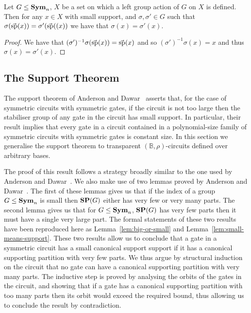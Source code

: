 \documentclass[../paper.tex]{subfiles}
\begin{document}
\begin{lem}
  Let $G \leq \text{\textbf{Sym}}_n$, $X$ be a set on which a left group action of $G$ on $X$
  is defined. Then for any $x \in X$ with small support, and $\sigma, \sigma'
  \in G$ such that $\sigma (\vec{\text{sp}}(x)) = \sigma' (\vec{\text{sp}}((x))$ we
  have that $\sigma (x) = \sigma'(x)$.
  \label{lem:support-determine-action}
\end{lem}
\begin{proof}
  We have that $(\sigma')^{-1}\sigma(\vec{\text{sp}}(x)) = \vec{\text{sp}}(x)$ and so
  $(\sigma')^{-1} \sigma (x) = x$ and thus $\sigma (x) = \sigma' (x)$.
\end{proof}


\subsection{The Support Theorem}
The support theorem of Anderson and Dawar~\cite{AndersonD17} asserts that, for
the case of symmetric circuits with symmetric gates, if the circuit is not too
large then the stabiliser group of any gate in the circuit has small support. In
particular, their result implies that every gate in a circuit contained in a
polynomial-size family of symmetric circuits with symmetric gates is constant
size. In this section we generalise the support theorem to transparent
$(\mathbb{B}, \rho)$-circuits defined over arbitrary bases.

The proof of this result follows a strategy broadly similar to the one used by
Anderson and Dawar~\cite{AndersonD17}. We also make use of two lemmas proved by
Anderson and Dawar~\cite{AndersonD17}. The first of these lemmas gives us that
if the index of a group $G \leq \text{\textbf{Sym}}_n$ is small then $\text{\textbf{SP}}(G)$ either has very
few or very many parts. The second lemma gives us that for $G \leq \text{\textbf{Sym}}_n$,
$\text{\textbf{SP}}(G)$ has very few parts then it must have a single very large part. The
formal statements of these two results have been reproduced here as
Lemma~\ref{lem:big-or-small} and Lemma~\ref{lem:small-means-support}. These two
results allow us to conclude that a gate in a symmetric circuit has a small
canonical support support if it has a canonical supporting partition with very
few parts. We thus argue by structural induction on the circuit that no gate can
have a canonical supporting partition with very many parts. The inductive step
is proved by analysing the orbits of the gates in the circuit, and showing that
if a gate has a canonical supporting partition with too many parts then its
orbit would exceed the required bound, thus allowing us to conclude the result
by contradiction.
\end{document}
